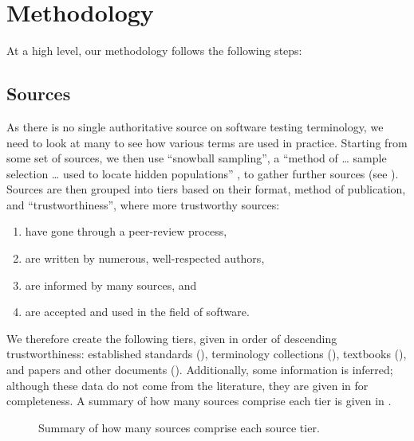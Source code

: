 \section{Methodology}
\label{methodology}

At a high level, our
methodology follows the following steps:



\subsection{Sources}
\label{sources}
As there is no single authoritative source on software testing terminology,
we need to look at many to see how various terms are used in practice.
Starting from some set of sources, we then use
``snowball sampling'', a ``method of \dots{} sample selection \dots{} used to
locate hidden populations'' \citep{Johnson2014}, to gather further sources
(see ). Sources are then grouped into tiers based on their
format, method of publication, and ``trustworthiness'', where more trustworthy
sources:
\begin{enumerate}
    \item have gone through a peer-review process,
    \item are written by numerous, well-respected authors,
    \item are informed by many sources, and
    \item are accepted and used in the field of software.
\end{enumerate}

We therefore create the following tiers, given in order of descending
trustworthiness: established standards (), terminology
collections (), textbooks (), and papers and other
documents (). \ifnotpaper
    Additionally, some information is inferred; although these data do not come
    from the literature, they are given in  for completeness.
\fi A summary of how many sources comprise each tier is given in
.

\begin{figure}
    \centering
    \caption{Summary of how many sources comprise each source tier.}
    \label{fig:sourceSummary}
\end{figure}


